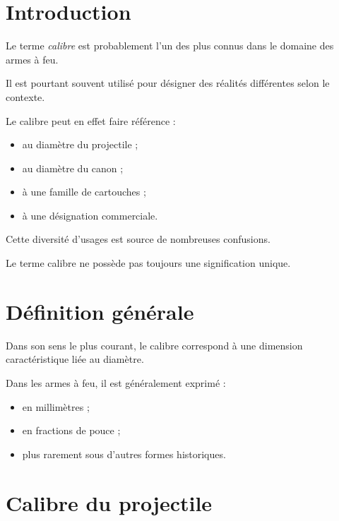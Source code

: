 
\section{Introduction}

Le terme \emph{calibre} est probablement l'un des plus connus dans le domaine
des armes à feu.

Il est pourtant souvent utilisé pour désigner des réalités différentes selon
le contexte.

Le calibre peut en effet faire référence :

\begin{itemize}
    \item au diamètre du projectile ;
    \item au diamètre du canon ;
    \item à une famille de cartouches ;
    \item à une désignation commerciale.
\end{itemize}

Cette diversité d'usages est source de nombreuses confusions.

\begin{aretenir}

Le terme calibre ne possède pas toujours une signification unique.

\end{aretenir}

\section{Définition générale}

Dans son sens le plus courant, le calibre correspond à une dimension
caractéristique liée au diamètre.

Dans les armes à feu, il est généralement exprimé :

\begin{itemize}
    \item en millimètres ;
    \item en fractions de pouce ;
    \item plus rarement sous d'autres formes historiques.
\end{itemize}

\section{Calibre du projectile}

